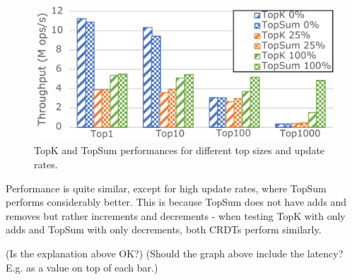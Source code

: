 \documentclass[sigplan,10pt]{acmart}
\begin{document}
\begin{figure}[h]
	\centering
	\includegraphics[width=.7\linewidth]{TopKVSTopSum_cut}
	\caption{TopK and TopSum performances for different top sizes and update rates.}
	\label{fig:(new)TopkVSTopsum}
\end{figure}

Performance is quite similar, except for high update rates, where TopSum performs considerably better.
This is because TopSum does not have adds and removes but rather increments and decrements - when testing TopK with only adds and TopSum with only decrements, both CRDTs perform similarly.

(Is the explanation above OK?)
(Should the graph above include the latency? E.g. as a value on top of each bar.)
\end{document}
